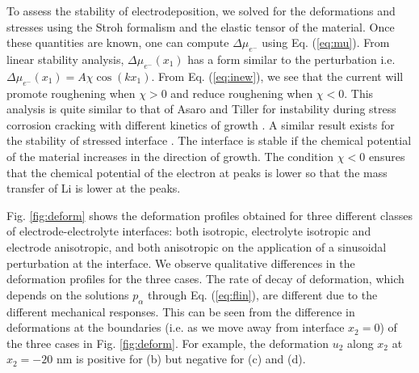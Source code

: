 \documentclass[%
reprint,
 amsmath,amssymb,
 aps,
 prb,
]{revtex4-1}
\begin{document}
To assess the stability of electrodeposition, we solved for the deformations and stresses using the Stroh formalism and the elastic tensor of the material. Once these quantities are known, one can compute $\Delta \mu_{e^-}$ using Eq. (\ref{eq:mu}). From linear stability analysis, $\Delta \mu_{e^-}(x_1)$ has a form similar to the perturbation i.e.  $\Delta \mu_{e^-}(x_1)=A\chi \cos(kx_1)$. From Eq. (\ref{eq:inew}), we see that the current will promote roughening when $\chi>0$ and reduce roughening when $\chi<0$. This analysis is quite similar to that of Asaro and Tiller for instability during stress corrosion cracking with different kinetics of growth \cite{Asaro1972}. A similar result exists for the stability of stressed interface \cite{freund2004thin}. The interface is stable if the chemical potential of the material increases in the direction of growth. The condition $\chi<0$ ensures that the chemical potential of the electron at peaks is lower so that the mass transfer of Li is lower at the peaks.


Fig. \ref{fig:deform} shows the deformation profiles obtained for three different classes of electrode-electrolyte interfaces: both isotropic, electrolyte isotropic and electrode anisotropic, and both anisotropic on the application of a sinusoidal perturbation at the interface. We observe qualitative differences in the deformation profiles for the three cases. The rate of decay of deformation, which depends on the solutions $p_\alpha$ through Eq. (\ref{eq:flin}), are different due to the different mechanical responses. This can be seen from the  difference in deformations at the boundaries (i.e. as we move away from interface $x_2=0$) of the three cases in Fig. \ref{fig:deform}. For example, the deformation $u_2$ along $x_2$ at $x_2=-20$ nm is positive for (b) but negative for (c) and (d).
\end{document}
